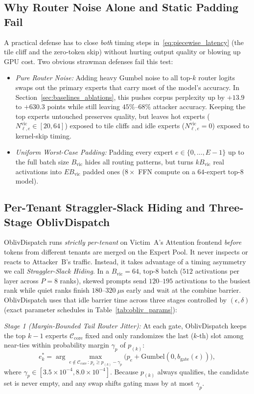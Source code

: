 \documentclass[11pt,a4paper]{article}
\renewcommand{\_}{\textunderscore\allowbreak}
\def\OD{OblivDispatch}%
\theoremstyle{definition}
\theoremstyle{remark}
\newcommand{\OD}{\textsc{OblivDispatch}}
\begin{document}
\subsection{Why Router Noise Alone and Static Padding Fail}
A practical defense has to close \emph{both} timing steps in~\eqref{eq:piecewise_latency} (the tile cliff and the zero-token skip) without hurting output quality or blowing up GPU cost. Two obvious strawman defenses fail this test:
\begin{itemize}
  \item \emph{Pure Router Noise:} Adding heavy Gumbel noise to all top-$k$ router logits swaps out the primary experts that carry most of the model's accuracy. In Section~\ref{sec:baselines_ablations}, this pushes corpus perplexity up by $+13.9$ to $+630.3$ points while still leaving $45\%$--$68\%$ attacker accuracy. Keeping the top experts untouched preserves quality, but leaves hot experts ($N_{\ell, e}^{\mathrm{vic}} \in [20, 64]$) exposed to tile cliffs and idle experts ($N_{\ell, e}^{\mathrm{vic}} = 0$) exposed to kernel-skip timing.
  \item \emph{Uniform Worst-Case Padding:} Padding every expert $e \in \{0, \dots, E-1\}$ up to the full batch size $B_{\mathrm{vic}}$ hides all routing patterns, but turns $k B_{\mathrm{vic}}$ real activations into $E B_{\mathrm{vic}}$ padded ones ($8\times$ FFN compute on a $64$-expert $\text{top-}8$ model).
\end{itemize}

\subsection{Per-Tenant Straggler-Slack Hiding and Three-Stage OblivDispatch}
\OD{} runs \emph{strictly per-tenant} on Victim~A's Attention frontend \emph{before} tokens from different tenants are merged on the Expert Pool. It never inspects or reacts to Attacker~B's traffic. Instead, it takes advantage of a timing asymmetry we call \emph{Straggler-Slack Hiding}. In a $B_{\mathrm{vic}} = 64$, $\text{top-}8$ batch ($512$ activations per layer across $P=8$ ranks), skewed prompts send $120$--$195$ activations to the busiest rank while quiet ranks finish $180$--$320~\mu\mathrm{s}$ early and wait at the combine barrier. \OD{} uses that idle barrier time across three stages controlled by $(\epsilon, \delta)$ (exact parameter schedules in Table~\ref{tab:obliv_params}):

\emph{Stage 1 (Margin-Bounded Tail Router Jitter):} At each gate, \OD{} keeps the top $k-1$ experts $\mathcal{C}_{\mathrm{core}}$ fixed and only randomizes the last ($k$-th) slot among near-ties within probability margin $\gamma_p$ of $p_{(k)}$:
\begin{equation}\label{eq:margin_gumbel}
  e_k^* = \arg\max_{e \notin \mathcal{C}_{\mathrm{core}} \,:\, p_e \ge p_{(k)} - \gamma_p} \big( p_e + \mathrm{Gumbel}(0, b_{\mathrm{gate}}(\epsilon)) \big),
\end{equation}
where $\gamma_p \in [3.5 \times 10^{-4}, 8.0 \times 10^{-4}]$. Because $p_{(k)}$ always qualifies, the candidate set is never empty, and any swap shifts gating mass by at most $\gamma_p$.
\end{document}
